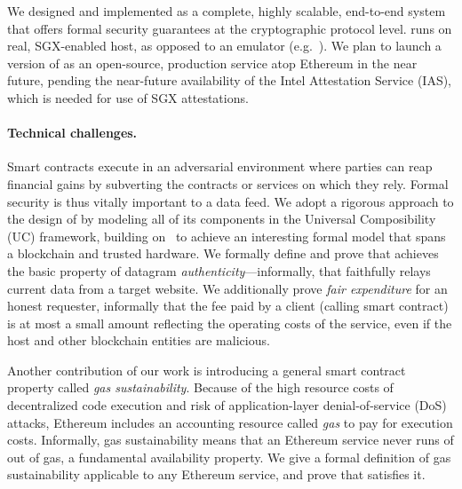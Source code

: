 We designed and implemented \tc as a complete, highly scalable, end-to-end system that offers formal security guarantees at the cryptographic protocol level. \tc runs on real, SGX-enabled host, as opposed to an emulator (e.g.~\cite{haven,VC3}). We plan to launch a version of \tc as an open-source, production service atop Ethereum in the near future, pending the near-future availability of the Intel Attestation Service (IAS), which is needed for use of SGX attestations. 


\paragraph{Technical challenges.} Smart contracts execute in an adversarial environment where parties can reap financial gains by subverting the contracts or services on which they rely. Formal security is thus vitally important to a data feed. We adopt a rigorous approach to the design of \tcs by modeling all of its components in the Universal Composibility (UC) framework, building on~\cite{hawk,sgxsok} to achieve an interesting formal model that spans a blockchain and trusted hardware. We formally define and prove that \tc achieves the basic property of datagram {\em authenticity}---informally, that \tc faithfully relays current data from a target website. We additionally prove {\em fair expenditure} for an honest requester, informally that the fee paid by a \tc client (calling smart contract) is at most a small amount reflecting the operating costs of the \tc service, even if the \tc host and other blockchain entities are malicious.

Another contribution of our work is introducing a general smart contract property called {\em gas sustainability}.
Because of the high resource costs of decentralized code execution and risk of application-layer denial-of-service (DoS) attacks, Ethereum includes an accounting resource called {\em gas} to pay for execution costs.  Informally, gas sustainability means that an Ethereum service never runs of out of gas, a fundamental availability property. We give a formal definition of gas sustainability applicable to any Ethereum service, and prove that \tc satisfies it.


